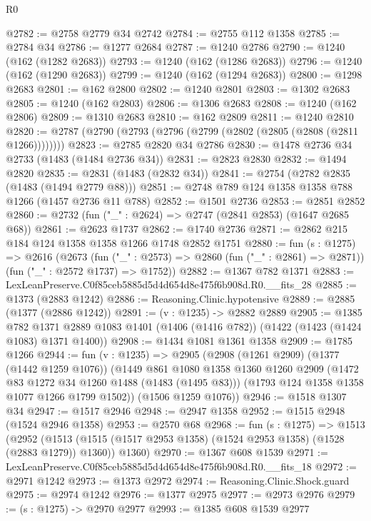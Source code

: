 \begin{lexlean}{R0}
\begin{coremodule}
@2782 := @2758 @2779 @34 @2742
@2784 := @2755 @112 @1358
@2785 := @2784 @34
@2786 := @1277 @2684
@2787 := @1240 @2786
@2790 := @1240 (@162 (@1282 @2683))
@2793 := @1240 (@162 (@1286 @2683))
@2796 := @1240 (@162 (@1290 @2683))
@2799 := @1240 (@162 (@1294 @2683))
@2800 := @1298 @2683
@2801 := @162 @2800
@2802 := @1240 @2801
@2803 := @1302 @2683
@2805 := @1240 (@162 @2803)
@2806 := @1306 @2683
@2808 := @1240 (@162 @2806)
@2809 := @1310 @2683
@2810 := @162 @2809
@2811 := @1240 @2810
@2820 := @2787 (@2790 (@2793 (@2796 (@2799 (@2802 (@2805 (@2808 (@2811 @1266))))))))
@2823 := @2785 @2820 @34 @2786
@2830 := @1478 @2736 @34 @2733 (@1483 (@1484 @2736 @34))
@2831 := @2823 @2830
@2832 := @1494 @2820
@2835 := @2831 (@1483 (@2832 @34))
@2841 := @2754 (@2782 @2835 (@1483 (@1494 @2779 @88)))
@2851 := @2748 @789 @124 @1358 @1358 @788 @1266 (@1457 @2736 @11 @788)
@2852 := @1501 @2736
@2853 := @2851 @2852
@2860 := @2732 (fun ("_" : @2624) => @2747 (@2841 @2853) (@1647 @2685 @68))
@2861 := @2623 @1737
@2862 := @1740 @2736
@2871 := @2862 @215 @184 @124 @1358 @1358 @1266 @1748 @2852 @1751
@2880 := fun (s : @1275) =>
  @2616
    (@2673
      (fun ("_" : @2573) => @2860 (fun ("_" : @2861) => @2871))
      (fun ("_" : @2572 @1737) => @1752))
@2882 := @1367 @782 @1371
@2883 := LexLeanPreserve.C0f85ceb5885d5d4d654d8e475f6b908d.R0.__fits_28
@2885 := @1373 (@2883 @1242)
@2886 := Reasoning.Clinic.hypotensive
@2889 := @2885 (@1377 (@2886 @1242))
@2891 := (v : @1235) -> @2882 @2889
@2905 := @1385
    @782
    @1371
    @2889
    @1083
    @1401
    (@1406 (@1416 @782))
    (@1422 (@1423 (@1424 @1083) @1371 @1400))
@2908 := @1434 @1081 @1361 @1358
@2909 := @1785 @1266
@2944 := fun (v : @1235) =>
  @2905
    (@2908
      (@1261 @2909)
      (@1377 (@1442 @1259 @1076))
      (@1449
        @861
        @1080
        @1358
        @1360
        @1260
        @2909
        (@1472 @83 @1272 @34 @1260 @1488 (@1483 (@1495 @83)))
        (@1793 @124 @1358 @1358 @1077 @1266 @1799 @1502))
      (@1506 @1259 @1076))
@2946 := @1518 @1307 @34
@2947 := @1517 @2946
@2948 := @2947 @1358
@2952 := @1515 @2948 (@1524 @2946 @1358)
@2953 := @2570 @68
@2968 := fun (s : @1275) =>
  @1513
    (@2952
      (@1513 (@1515 (@1517 @2953 @1358) (@1524 @2953 @1358) (@1528 (@2883 @1279)) @1360))
      @1360)
@2970 := @1367 @608 @1539
@2971 := LexLeanPreserve.C0f85ceb5885d5d4d654d8e475f6b908d.R0.__fits_18
@2972 := @2971 @1242
@2973 := @1373 @2972
@2974 := Reasoning.Clinic.Shock.guard
@2975 := @2974 @1242
@2976 := @1377 @2975
@2977 := @2973 @2976
@2979 := (s : @1275) -> @2970 @2977
@2993 := @1385
    @608
    @1539
    @2977

\end{coremodule}
\end{lexlean}
